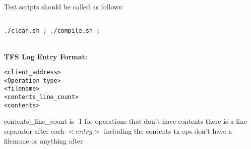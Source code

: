 \documentclass[11pt]{article}
\begin{document}
Test scripts should be called as follows:

\begin{verbatim}

./clean.sh ; ./compile.sh ; 

\end{verbatim}

\\

\textbf{TFS Log Entry Format:} \\

\begin{verbatim}
<client_address>
<Operation type>
<filename>
<contents_line_count>
<contents>
\end{verbatim}

contents\_line\_count is -1 for operations that don't have contents
there is a line separator after each $<entry>$ including the contents
tx ops don't have a filename or anything after
\end{document}
